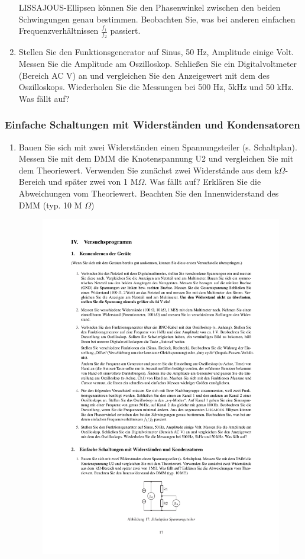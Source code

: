 \documentclass[12pt]{scrartcl}
\begin{document}
\begin{enumerate}
LISSAJOUS-Ellipsen können Sie den Phasenwinkel zwischen den beiden Schwingungen genau bestimmen. Beobachten Sie, was bei anderen einfachen Frequenzverhältnissen $\frac{f_1}{f_2}$ passiert.
\item
Stellen Sie den Funktionsgenerator auf Sinus, 50 Hz, Amplitude einige Volt. Messen Sie die Amplitude am Oszilloskop. Schließen Sie ein Digitalvoltmeter (Bereich AC V) an und vergleichen Sie den Anzeigewert mit dem des Oszilloskops. Wiederholen Sie die Messungen bei 500 Hz, 5kHz und 50 kHz. Was fällt auf?
\end{enumerate}
\subsubsection{Einfache Schaltungen mit Widerständen und Kondensatoren} 
\begin{enumerate}
\item
Bauen Sie sich mit zwei Widerständen einen Spannungsteiler (s. Schaltplan). Messen Sie mit dem DMM die Knotenspannung U2 und vergleichen Sie mit dem Theoriewert. Verwenden Sie zunächst zwei Widerstände aus dem k$\Omega$-Bereich und später zwei von 1 M$\Omega$. Was fällt auf? Erklären Sie die Abweichungen vom Theoriewert. Beachten Sie den Innenwiderstand des DMM (typ. 10 M
$\Omega$)
\begin{figure}[htbp] 
  \centering
    \includegraphics[trim = 30mm 35mm 1mm 228mm, clip, scale = 1]{spannungsteiler.pdf}

\end{figure}
\end{enumerate}
\end{document}
